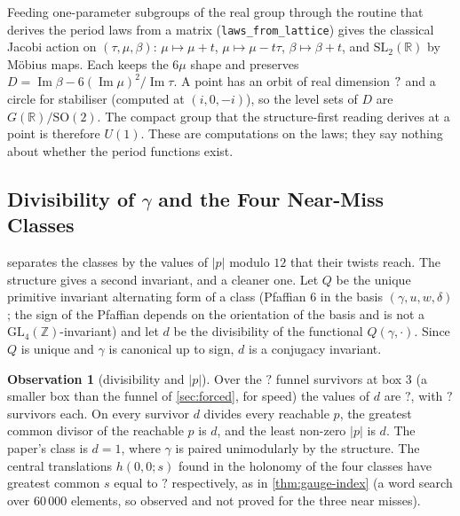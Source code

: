 \documentclass[11pt,a4paper]{article}
\newcommand{\SSGaSurvivors}{?}\newcommand{\SSGaPerClass}{?}\newcommand{\SSGaDValues}{?}
\newcommand{\SSGaCentralIndex}{?}
\newcommand{\ZZ}{\mathbb{Z}}
\newcommand{\RR}{\mathbb{R}}
\newcommand{\SL}{\mathrm{SL}}
\newcommand{\GL}{\mathrm{GL}}
\theoremstyle{plain}
\theoremstyle{definition}
\newtheorem{observation}{Observation}
\begin{document}
Feeding one-parameter subgroups of the real group through the routine that derives the
period laws from a matrix (\texttt{laws\_from\_lattice}) gives the classical Jacobi action on
$(\tau,\mu,\beta)$: $\mu\mapsto\mu+t$, $\mu\mapsto\mu-t\tau$, $\beta\mapsto\beta+t$, and
$\SL_2(\RR)$ by M\"obius maps. Each keeps the $6\mu$ shape and preserves
$D=\operatorname{Im}\beta-6(\operatorname{Im}\mu)^2/\operatorname{Im}\tau$. A point has an
orbit of real dimension $?$ and a circle for stabiliser (computed at
$(i,0,-i)$), so the level sets of $D$ are $G(\RR)/\mathrm{SO}(2)$. The compact group that
the structure-first reading derives at a point is therefore $U(1)$. These are computations on the
laws; they say nothing about whether the period functions exist.

\subsection{Divisibility of \texorpdfstring{$\gamma$}{gamma} and the Four Near-Miss Classes}

 separates the \SSClassesWord{} classes by the values of $|p|$ modulo $12$ that
their twists reach. The structure gives a second invariant, and a cleaner one. Let $Q$ be the unique primitive invariant alternating form of a class
(Pfaffian $6$ in the basis $(\gamma,u,w,\delta)$; the sign of the Pfaffian depends on the orientation of the basis and is not a $\GL_4(\ZZ)$-invariant)
and let $d$ be the divisibility of the functional $Q(\gamma,\cdot)$. Since $Q$ is unique and $\gamma$ is canonical up to sign, $d$ is a
conjugacy invariant.

\begin{observation}[divisibility and $|p|$]
\label{obs:gauge-classes}
Over the $\SSGaSurvivors$ funnel survivors at box $3$ (a smaller box than the funnel of \cref{sec:forced}, for speed) the values of $d$ are $\SSGaDValues$, with
$\SSGaPerClass$ survivors each. On every survivor $d$ divides every reachable $p$, the greatest common divisor of the reachable $p$
is $d$, and the least non-zero $|p|$ is $d$. The paper's class is $d=1$, where $\gamma$ is paired
unimodularly by the structure. The central translations $h(0,0;s)$ found in the holonomy of the four classes
have greatest common $s$ equal to $\SSGaCentralIndex$ respectively, as in \cref{thm:gauge-index} (a word search over
$60\,000$ elements, so observed and not proved for the three near misses).
\end{observation}
\end{document}
